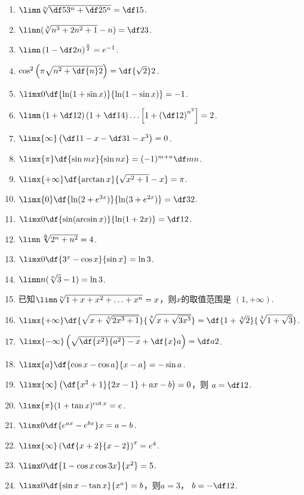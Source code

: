 \begin{enumerate}
	\item $\limn\sqrt[n]{\df5{3^n}+\df2{5^n}}=\df15$.
	\item $\limn(\sqrt[3]{n^3+2n^2+1}-n)=\df23$.
	\item $\limn\left(1-\df2n\right)^{\frac n2}=e^{-1}$.
	\item $\cos^2\left(\pi\sqrt{n^2+\df{n}2}\right)=\df{\sqrt2}2$.
	\item $\limx0\df{\ln(1+\sin x)}{\ln(1-\sin x)}=-1$.
	\item $\limn\left(1+\df12\right)\left(1+\df14\right)
	\ldots\left[1+\left(\df12\right)^{n^2}\right]=2$.
	\item $\limx{\infty}\left(\df1{1-x}-\df3{1-x^3}\right)=0$.
	\item $\limx{\pi}\df{\sin mx}{\sin nx}=(-1)^{m+n}\df mn$.
	\item $\limx{+\infty}\df{\arctan x}{\sqrt{x^2+1}-x}=\pi$.
	\item $\limx{0}\df{\ln(2+e^{3x})}{\ln(3+e^{2x})}=\df32$.
	\item $\limx0\df{\sin(\arcsin x)}{\ln(1+2x)}=\df12$.
	\item $\limn\sqrt[\frac n2]{2^n+n^2}=4$.
	\item $\limx0\df{3^x-\cos x}{\sin x}=\ln3$.
	\item $\limn n(\sqrt[n]{3}-1)=\ln3$.
	\item 已知$\limn\sqrt[n]{1+x+x^2+\ldots+x^n}=x$，则$x$的取值范围是
	$(1,+\infty)$.
	\item $\limx{+\infty}\df{\sqrt{x+\sqrt[3]{2x^3+1}}}{\sqrt[3]
	{x+\sqrt{3x^3}}}=\df{1+\sqrt[3]{2}}{\sqrt[3]{1+\sqrt3}}$.
	\item $\limx{-\infty}\left(\sqrt{\df{x^2}{a^2}-x}
	+\df{x}a\right)=\df a2$.
	\item $\limx{a}\df{\cos x-\cos a}{x-a}=-\sin a$.
	\item $\limx{\infty}\left(\df{x^2+1}{2x-1}+ax-b\right)=0$，则
	$a=\df12$.
	\item $\limx{\pi}(1+\tan x)^{\cot x}=e$.
	\item $\limx0\df{e^{ax}-e^{bx}}x=a-b$.
	\item $\limx{\infty}\left(\df{x+2}{x-2}\right)^x=e^4$.
	\item $\limx0\df{1-\cos x\cos 3x}{x^2}=5$.
	\item $\limx0\df{\sin x-\tan x}{x^a}=b$，则$a=3$，
	$b=-\df12$.
\end{enumerate}